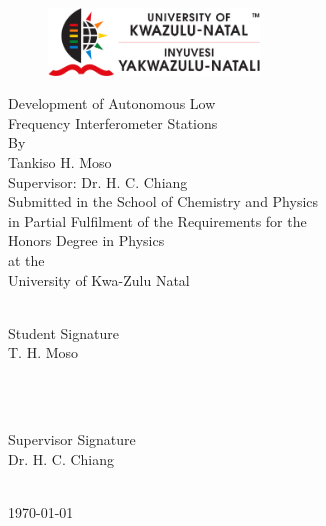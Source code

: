 \documentclass[12pt,a4paper]{report}
\begin{document}
	\begin{titlepage}
		
		\newcommand{\HRule}{\rule{\linewidth}{0.5mm}} %
		
		\begin{center}
		\begin{figure}[ht]
			\centering
				\includegraphics[width=0.5\textwidth]{Figures/UKZNLOGO.png}\\[1cm]
		\end{figure}
		
		{\LARGE Development of Autonomous Low\\[0.3cm] Frequency Interferometer Stations}\\[1cm]
	    { By}\\[0.5cm]
		{\large Tankiso H. Moso}\\[0.5cm]
		{\large Supervisor: Dr. H. C. Chiang}\\[1.5cm]
		{\small Submitted in the School of Chemistry and Physics\\in Partial Fulfilment of the Requirements for the\\Honors Degree in Physics\\at the\\University of Kwa-Zulu Natal}\\[4cm]
		
		\begin{minipage}{0.4\textwidth}
			\begin{flushleft} \large
				\hrulefill\\
				Student Signature\\
				T. H. Moso %
			\end{flushleft}
		\end{minipage}
		~
		\begin{minipage}{0.4\textwidth}
			\begin{flushright} \large
				\hrulefill\\
				Supervisor Signature \\
				Dr. H. C. Chiang %
			\end{flushright}
		\end{minipage}\\[3cm]
		
		{\large \today}\\[0cm] %
		\end{center}	
	\end{titlepage}
\end{document}
